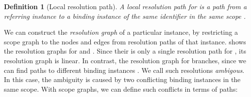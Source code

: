 % 



\newtheorem{definition}{Definition}
\begin{definition}[Local resolution path]
  A \emph{local resolution path for } is
  a path 
  from a referring instance %
  to a binding instance %
  of the same identifier 
  in the same scope .
\end{definition}


We can construct the \emph{resolution graph} of a particular instance,
  by restricting a scope graph to the nodes and edges from resolution paths of that instance.
 shows the resolution graphs for  and
  .
Since their is only a single resolution path for ,
  its resolution graph is linear.
In contrast, the resolution graph for  branches,
  since we can find paths to different binding instances .
We call such resolutions \emph{ambigous}.
In this case, the ambiguity is caused by 
  two conflicting binding instances 
  in the same scope.
With scope graphs, we can define such conflicts in terms of paths:

